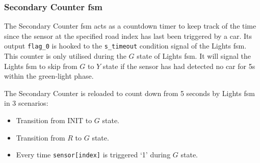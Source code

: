 \subsubsection{Secondary Counter \acs{fsm}}
The Secondary Counter \ac{fsm} acts as a countdown timer to keep track of the time since the sensor at the specified road index has last been triggered by a car. Its output \texttt{flag\_0} is hooked to the \texttt{s\_timeout} condition signal of the Lights \ac{fsm}. This counter is only utilised during the $G$ state of Lights \ac{fsm}. It will signal the Lights \ac{fsm} to skip from $G$ to $Y$ state if the sensor has had detected no car for 5\unit{\second} within the green-light phase.

The Secondary Counter is reloaded to count down from 5 seconds by Lights \ac{fsm} in 3 scenarios:
\begin{itemize}
	\item Transition from INIT to $G$ state.
	\item Transition from $R$ to $G$ state.
	\item Every time \texttt{sensor[index]} is triggered `1' during $G$ state.
\end{itemize}



